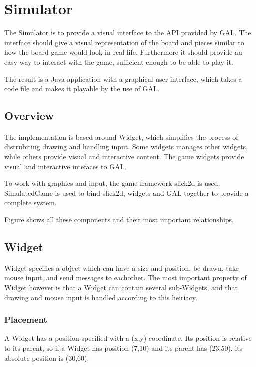 \section{Simulator}

The Simulator is to provide a visual interface to the API provided by GAL. The interface should give a visual representation of the board and pieces similar to how the board game would look in real life. Furthermore it should provide an easy way to interact with the game, sufficient enough to be able to play it.

The result is a Java application with a graphical user interface, which takes a \productname code file and makes it playable by the use of GAL.


\subsection{Overview}

The implementation is based around Widget, which simplifies the process of distrubiting drawing and handling input. Some widgets manages other widgets, while others provide visual and interactive content. The game widgets provide visual and interactive intefaces to GAL.

To work with graphics and input, the game framework slick2d is used. SimulatedGame is used to bind slick2d, widgets and GAL together to provide a complete system.

Figure  shows all these components and their most important relationships.


\subsection{Widget}

Widget specifies a object which can have a size and position, be drawn, take mouse input, and send messages to eachother. The most important property of Widget however is that a Widget can contain several sub-Widgets, and that drawing and mouse input is handled according to this heiriacy.


\subsubsection{Placement}

A Widget has a position specified with a (x,y) coordinate. Its position is relative to its parent, so if a Widget has position (7,10) and its parent has (23,50), its absolute position is (30,60).

